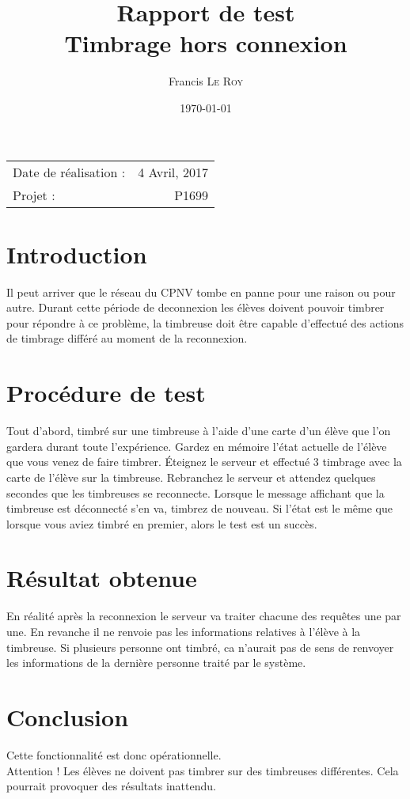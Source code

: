 \documentclass[10pt,a4paper,onecolumn]{article}
\title{Rapport de test \\ Timbrage hors connexion}
\author{Francis \textsc{Le Roy}}
\date{\today}
\begin{document}
\maketitle
\thispagestyle{fancy}

\begin{center}
\begin{tabular}{l r}
Date de réalisation : & 4 Avril, 2017 \\
Projet : & P1699 \\
\end{tabular}
\end{center}

\section{Introduction}
Il peut arriver que le réseau du CPNV tombe en panne pour une raison ou pour autre. Durant cette période de deconnexion les élèves doivent pouvoir timbrer pour répondre à ce problème, la timbreuse doit être capable d'effectué des actions de timbrage différé au moment de la reconnexion.
\section{Procédure de test}
Tout d'abord, timbré sur une timbreuse à l'aide d'une carte d'un élève que l'on gardera durant toute l'expérience. Gardez en mémoire l'état actuelle de l'élève que vous venez de faire timbrer. Éteignez le serveur et effectué 3 timbrage avec la carte de l'élève sur la timbreuse. Rebranchez le serveur et attendez quelques secondes que les timbreuses se reconnecte. Lorsque le message affichant que la timbreuse est déconnecté s'en va, timbrez de nouveau. Si l'état est le même que lorsque vous aviez timbré en premier, alors le test est un succès.
\section{Résultat obtenue}
En réalité après la reconnexion le serveur va traiter chacune des requêtes une par une. En revanche il ne renvoie pas les informations relatives à l'élève à la timbreuse. Si plusieurs personne ont timbré, ca n'aurait pas de sens de renvoyer les informations de la dernière personne traité par le système.
\section{Conclusion}
Cette fonctionnalité est donc opérationnelle.\\
{\color{red}Attention ! Les élèves ne doivent pas timbrer sur des timbreuses différentes. Cela pourrait provoquer des résultats inattendu.}
\end{document}
